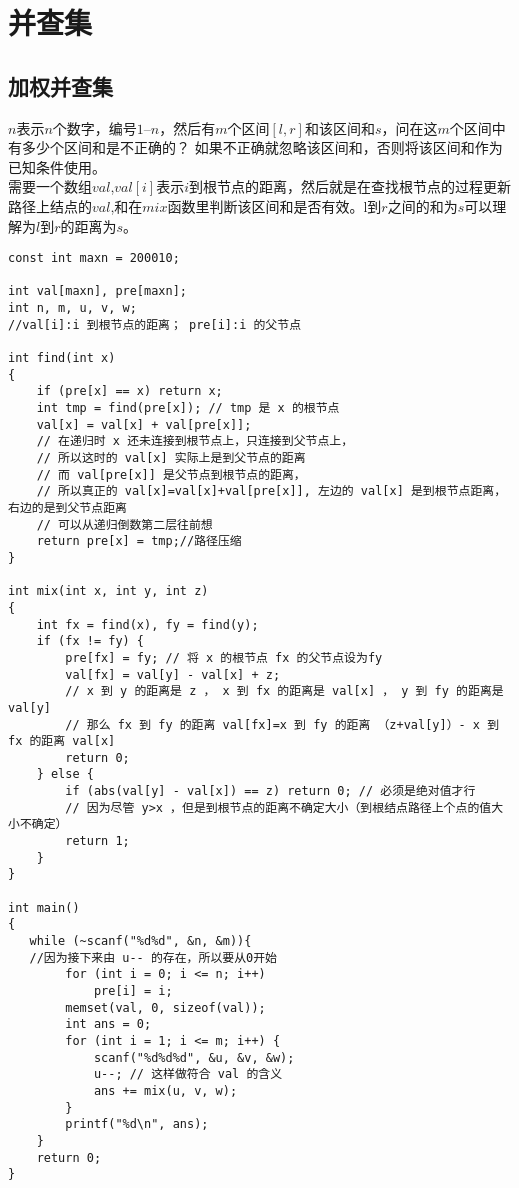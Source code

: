 \clearpage
\section{并查集}

\subsection{加权并查集}
$n$表示$n$个数字，编号$1–n$，然后有$m$个区间$[l,r]$和该区间和$s$，问在这$m$个区间中有多少个区间和是不正确的？ 如果不正确就忽略该区间和，否则将该区间和作为已知条件使用。\\

需要一个数组$val$,$val[i]$表示$i$到根节点的距离，然后就是在查找根节点的过程更新路径上结点的$val$,和在$mix$函数里判断该区间和是否有效。l到$r$之间的和为$s$可以理解为$l$到$r$的距离为$s$。
\begin{lstlisting}
const int maxn = 200010;

int val[maxn], pre[maxn];
int n, m, u, v, w;
//val[i]:i 到根节点的距离； pre[i]:i 的父节点

int find(int x)
{
    if (pre[x] == x) return x;
    int tmp = find(pre[x]); // tmp 是 x 的根节点
    val[x] = val[x] + val[pre[x]];
    // 在递归时 x 还未连接到根节点上，只连接到父节点上，
    // 所以这时的 val[x] 实际上是到父节点的距离
    // 而 val[pre[x]] 是父节点到根节点的距离，
    // 所以真正的 val[x]=val[x]+val[pre[x]], 左边的 val[x] 是到根节点距离，右边的是到父节点距离
    // 可以从递归倒数第二层往前想
    return pre[x] = tmp;//路径压缩
}

int mix(int x, int y, int z)
{
    int fx = find(x), fy = find(y);
    if (fx != fy) {
        pre[fx] = fy; // 将 x 的根节点 fx 的父节点设为fy
        val[fx] = val[y] - val[x] + z;
        // x 到 y 的距离是 z ， x 到 fx 的距离是 val[x] ， y 到 fy 的距离是 val[y]
        // 那么 fx 到 fy 的距离 val[fx]=x 到 fy 的距离 （z+val[y]）- x 到 fx 的距离 val[x]
        return 0;
    } else {
        if (abs(val[y] - val[x]) == z) return 0; // 必须是绝对值才行
        // 因为尽管 y>x ，但是到根节点的距离不确定大小（到根结点路径上个点的值大小不确定）
        return 1;
    }
}

int main()
{
   while (~scanf("%d%d", &n, &m)){
   //因为接下来由 u-- 的存在，所以要从0开始
        for (int i = 0; i <= n; i++)
            pre[i] = i;
        memset(val, 0, sizeof(val));
        int ans = 0;
        for (int i = 1; i <= m; i++) {
            scanf("%d%d%d", &u, &v, &w);
            u--; // 这样做符合 val 的含义
            ans += mix(u, v, w);
        }
        printf("%d\n", ans);
    }
    return 0;
}
\end{lstlisting}

